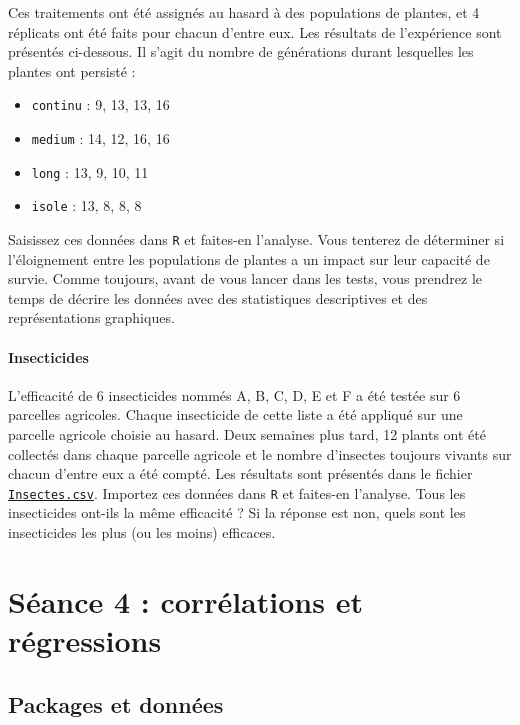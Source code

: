 \documentclass[
  a4paper,
]{article}
\providecommand{\tightlist}{%
  \setlength{\itemsep}{0pt}\setlength{\parskip}{0pt}}
\begin{document}
Ces traitements ont été assignés au hasard à des populations de plantes, et 4 réplicats ont été faits pour chacun d'entre eux. Les résultats de l'expérience sont présentés ci-dessous. Il s'agit du nombre de générations durant lesquelles les plantes ont persisté :

\begin{itemize}
\tightlist
\item
  \texttt{continu} : 9, 13, 13, 16
\item
  \texttt{medium} : 14, 12, 16, 16
\item
  \texttt{long} : 13, 9, 10, 11
\item
  \texttt{isole} : 13, 8, 8, 8
\end{itemize}

Saisissez ces données dans \texttt{R} et faites-en l'analyse. Vous tenterez de déterminer si l'éloignement entre les populations de plantes a un impact sur leur capacité de survie. Comme toujours, avant de vous lancer dans les tests, vous prendrez le temps de décrire les données avec des statistiques descriptives et des représentations graphiques.

\hypertarget{insecticides}{%
\paragraph{Insecticides}\label{insecticides}}

L'efficacité de 6 insecticides nommés A, B, C, D, E et F a été testée sur 6 parcelles agricoles. Chaque insecticide de cette liste a été appliqué sur une parcelle agricole choisie au hasard. Deux semaines plus tard, 12 plants ont été collectés dans chaque parcelle agricole et le nombre d'insectes toujours vivants sur chacun d'entre eux a été compté. Les résultats sont présentés dans le fichier \href{https://besibo.github.io/Biometrie3/data/Insectes.csv}{\texttt{Insectes.csv}}. Importez ces données dans \texttt{R} et faites-en l'analyse. Tous les insecticides ont-ils la même efficacité ? Si la réponse est non, quels sont les insecticides les plus (ou les moins) efficaces.

\hypertarget{suxe9ance-4-corruxe9lations-et-ruxe9gressions}{%
\section{Séance 4 : corrélations et régressions}\label{suxe9ance-4-corruxe9lations-et-ruxe9gressions}}

\hypertarget{packages-et-donnuxe9es-1}{%
\subsection{Packages et données}\label{packages-et-donnuxe9es-1}}
\end{document}
